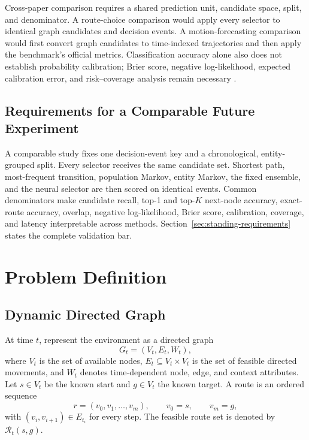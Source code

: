 \documentclass[11pt,letterpaper]{article}
\newcommand{\Rcal}{\mathcal{R}}
\begin{document}
Cross-paper comparison requires a shared prediction unit, candidate space, split, and denominator. A route-choice comparison would apply every selector to identical graph candidates and decision events. A motion-forecasting comparison would first convert graph candidates to time-indexed trajectories and then apply the benchmark's official metrics. Classification accuracy alone also does not establish probability calibration; Brier score, negative log-likelihood, expected calibration error, and risk--coverage analysis remain necessary \cite{guo2017}.

\subsection{Requirements for a Comparable Future Experiment}

A comparable study fixes one decision-event key and a chronological, entity-grouped split. Every selector receives the same candidate set. Shortest path, most-frequent transition, population Markov, entity Markov, the fixed ensemble, and the neural selector are then scored on identical events. Common denominators make candidate recall, top-1 and top-$K$ next-node accuracy, exact-route accuracy, overlap, negative log-likelihood, Brier score, calibration, coverage, and latency interpretable across methods. Section~\ref{sec:standing-requirements} states the complete validation bar.

\section{Problem Definition}

\subsection{Dynamic Directed Graph}

At time $t$, represent the environment as a directed graph
\begin{equation}
G_t=(V_t,E_t,W_t),
\end{equation}
where $V_t$ is the set of available nodes, $E_t\subseteq V_t\times V_t$ is the set of feasible directed movements, and $W_t$ denotes time-dependent node, edge, and context attributes. Let $s\in V_t$ be the known start and $g\in V_t$ the known target. A route is an ordered sequence
\begin{equation}
r=(v_0,v_1,\ldots,v_m), \qquad v_0=s, \qquad v_m=g,
\end{equation}
with $(v_i,v_{i+1})\in E_{t_i}$ for every step. The feasible route set is denoted by $\Rcal_t(s,g)$.
\end{document}
